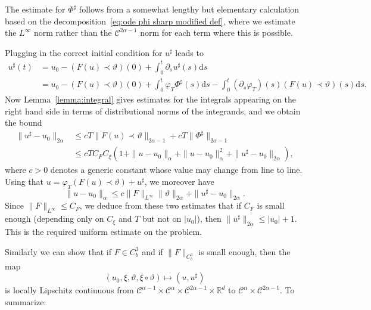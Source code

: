 \documentclass[11pt,a4paper]{article}
\newcommand{\mathd}{\mathrm{d}}
\theoremstyle{remark}
\newcommand{\CC}{\ensuremath{\mathscr{C}}}
\begin{document}
The estimate for $\Phi^{\sharp}$ follows from a somewhat lengthy but
elementary calculation based on the decomposition~\eqref{eq:ode phi sharp modified def}, where we estimate the $L^{\infty}$ norm rather than the
$\CC^{2 \alpha -1}$ norm for each term where this is possible.

Plugging in the correct initial condition for $u^{\sharp}$ leads to
\begin{align*}
   u^{\sharp} ( t ) &= u_{0} - ( F ( u ) \prec \vartheta ) ( 0 ) + \int_{0}^{t}\partial_{s} u^{\sharp} ( s ) \mathd s \\
   & =u_{0} - ( F ( u ) \prec \vartheta ) ( 0 ) + \int_{0}^{t} \varphi_{T} \Phi^{\sharp} ( s ) \mathd s- \int_{0}^{t} ( \partial_{s} \varphi_{T} ) ( s )  ( F ( u ) \prec \vartheta ) ( s ) \mathd s.
\end{align*}
Now Lemma~\ref{lemma:integral} gives estimates for the integrals appearing on
the right hand side in terms of distributional norms of the integrands, and we
obtain the bound
\begin{align*}
   \| u^{\sharp} -u_{0} \|_{2 \alpha} & \leqslant c T \| F ( u ) \prec \vartheta \|_{2 \alpha -1} +c T \| \Phi^{\sharp} \|_{2 \alpha -1} \\
   & \leqslant c T C_{F} C_{\xi} ( 1+ \| u-u_{0} \|_{\alpha} + \| u-u_{0} \|^{2}_{\alpha} + \| u^{\sharp} -u_{0} \|_{2 \alpha} ),
\end{align*}
where $c>0$ denotes a generic constant whose value may change from line to
line. Using that $u= \varphi_{T} (F ( u ) \prec \vartheta ) +u^{\sharp}$, we moreover have
\[
   \| u-u_{0} \|_{\alpha} \leqslant c  \| F \|_{L^{\infty}} \| \vartheta \|_{2 \alpha} + \| u^{\sharp} -u_{0} \|_{2 \alpha}.
\]
Since $\| F \|_{L^{\infty}} \leqslant C_{F}$, we deduce from these two
estimates that if $C_{F}$ is small enough (depending only on $C_{\xi}$ and $T$
but not on $| u_{0} |$), then $\| u^{\sharp} \|_{2 \alpha} \leqslant | u_{0} | +1$. 
This is the required uniform estimate on the problem.



Similarly we can show that if $F \in C^{3}_{b}$ and if $\| F \|_{C^{3}_{b}}$
is small enough, then the map
\[
   (u_0, \xi , \vartheta , \xi \circ   \vartheta) \mapsto ( u,u^{\sharp} )
\]
is locally Lipschitz continuous from $\CC^{\alpha -1} \times \CC^{\alpha}\times \CC^{2 \alpha -1} \times \mathbb{R}^{d}$ to $\CC^{\alpha} \times \CC^{2 \alpha -1}$. To summarize:
\end{document}
